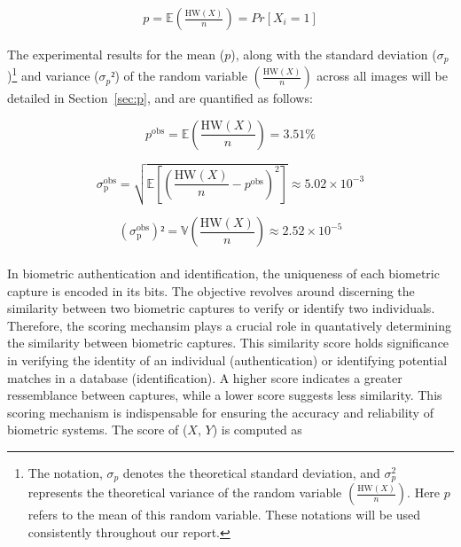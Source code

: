 \begin{equation} \label{eq:p}
    \begin{aligned}
        p = \mathbb{E}\left( \frac{\text{HW}(X)}{n} \right) = Pr\left[X_i = 1\right]
    \end{aligned}
\end{equation}

\newpage
The experimental results for the mean (\(p\)), along with the standard deviation (\(\sigma_p\))\footnote{The notation, \( \sigma_{p}\) denotes the theoretical standard deviation, and \(\sigma^2_p \) represents the theoretical variance of the random variable \(\left( \frac{\text{HW}(X)}{n} \right)\). Here $p$ refers to the mean of this random variable. These notations will be used consistently throughout our report.} and variance (\(\sigma_{p}²\)) of the random variable \(\left( \frac{\text{HW}(X)}{n} \right)\) across all images will be detailed in Section~\ref{sec:p}, and are quantified as follows:

\begin{equation} \label{eq:proba1}
    p^{\text{obs}} = \mathbb{E}\left( \frac{\text{HW}(X)}{n} \right) = 3.51\%
\end{equation}


\begin{equation} \label{eq:proba2}
    \sigma_{\text{p}}^{\text{obs}} = \sqrt{\mathbb{E} \left[ \left( \frac{\text{HW}(X)}{n} - p^{\text{obs}} \right)^2 \right]} \approx 5.02 \times 10^{-3}
\end{equation}

\begin{equation} \label{eq:proba3}
    (\sigma_{\text{p}}^{\text{obs}})² = \mathbb{V}\left( \frac{\text{HW}(X)}{n} \right)  \approx 2.52 \times 10^{-5}
\end{equation}\\

In biometric authentication and identification, the uniqueness of each biometric capture is encoded in its bits. The objective revolves around discerning the similarity between two biometric captures to verify or identify two individuals. Therefore, the scoring mechansim plays a crucial role in quantatively determining the similarity between biometric captures. This similarity score holds significance in verifying the identity of an individual (authentication) or identifying potential matches in a database (identification). A higher score indicates a greater ressemblance between captures, while a lower score suggests less similarity. This scoring mechanism is indispensable for ensuring the accuracy and reliability of biometric systems. The score of (\(X\), \(Y\)) is computed as


